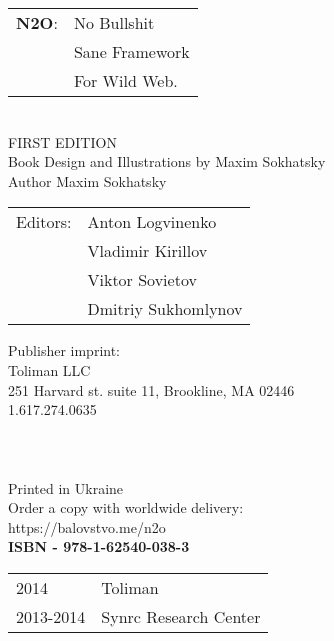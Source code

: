 \begingroup
{}
\parindent 0pt
\parskip
\baselineskip

\begin{tabular}{ll}
{\bf N2O}: & No Bullshit \\
    & Sane Framework \\
    & For Wild Web. \\
\end{tabular}
\\

FIRST EDITION \\

Book Design and Illustrations by Maxim Sokhatsky \\
Author Maxim Sokhatsky \\

\begin{tabular}{ll}
Editors: & Anton Logvinenko \\
         & Vladimir Kirillov \\
         & Viktor Sovietov \\
         & Dmitriy Sukhomlynov \\
\end{tabular}

Publisher imprint: \\
Toliman LLC \\
251 Harvard st. suite 11, Brookline, MA 02446 \\
1.617.274.0635 \\
\\
\\
\\




Printed in Ukraine \\

Order a copy with worldwide delivery: \\
https://balovstvo.me/n2o \\

{\bf  ISBN - 978-1-62540-038-3\hspace{2em}}

\begin{tabular}{ll}
\textcopyright{} 2014 & Toliman \\
\textcopyright{} 2013-2014 & Synrc Research Center
\end{tabular}

\endgroup

   \thispagestyle{empty}
 